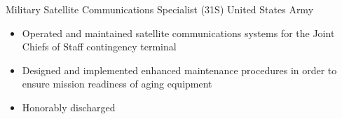 \cventry
    {Military}
    {Satellite Communications Specialist (31S)}
    {United States Army}
    {}
    {}
    {\begin{itemize}
        \item Operated and maintained satellite communications systems for the Joint Chiefs of Staff
        contingency terminal
        \item Designed and implemented enhanced maintenance procedures in order to ensure mission
        readiness of aging equipment
        \item Honorably discharged
    \end{itemize}}